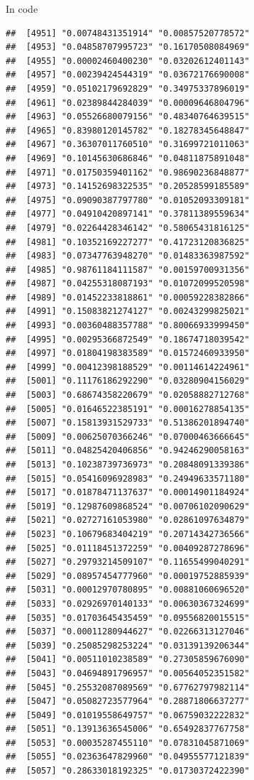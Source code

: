 \documentclass[ignorenonframetext,]{beamer}
\begin{document}
\begin{frame}[fragile]{In code}
\begin{verbatim}
##  [4951] "0.00748431351914" "0.00857520778572"
##  [4953] "0.04858707995723" "0.16170508084969"
##  [4955] "0.00002460400230" "0.03202612401143"
##  [4957] "0.00239424544319" "0.03672176690008"
##  [4959] "0.05102179692829" "0.34975337896019"
##  [4961] "0.02389844284039" "0.00009646804796"
##  [4963] "0.05526680079156" "0.48340764639515"
##  [4965] "0.83980120145782" "0.18278345648847"
##  [4967] "0.36307011760510" "0.31699721011063"
##  [4969] "0.10145630686846" "0.04811875891048"
##  [4971] "0.01750359401162" "0.98690236848877"
##  [4973] "0.14152698322535" "0.20528599185589"
##  [4975] "0.09090387797780" "0.01052093309181"
##  [4977] "0.04910420897141" "0.37811389559634"
##  [4979] "0.02264428346142" "0.58065431816125"
##  [4981] "0.10352169227277" "0.41723120836825"
##  [4983] "0.07347763948270" "0.01483363987592"
##  [4985] "0.98761184111587" "0.00159700931356"
##  [4987] "0.04255318087193" "0.01072099520598"
##  [4989] "0.01452233818861" "0.00059228382866"
##  [4991] "0.15083821274127" "0.00243299825021"
##  [4993] "0.00360488357788" "0.80066933999450"
##  [4995] "0.00295366872549" "0.18674718039542"
##  [4997] "0.01804198383589" "0.01572460933950"
##  [4999] "0.00412398188529" "0.00114614224961"
##  [5001] "0.11176186292290" "0.03280904156029"
##  [5003] "0.68674358220679" "0.02058882712768"
##  [5005] "0.01646522385191" "0.00016278854135"
##  [5007] "0.15813931529733" "0.51386201894740"
##  [5009] "0.00625070366246" "0.07000463666645"
##  [5011] "0.04825420406856" "0.94246290058163"
##  [5013] "0.10238739736973" "0.20848091339386"
##  [5015] "0.05416096928983" "0.24949633571180"
##  [5017] "0.01878471137637" "0.00014901184924"
##  [5019] "0.12987609868524" "0.00706102090629"
##  [5021] "0.02727161053980" "0.02861097634879"
##  [5023] "0.10679683404219" "0.20714342736566"
##  [5025] "0.01118451372259" "0.00409287278696"
##  [5027] "0.29793214509107" "0.11655499040291"
##  [5029] "0.08957454777960" "0.00019752885939"
##  [5031] "0.00012970780895" "0.00881060696520"
##  [5033] "0.02926970140133" "0.00630367324699"
##  [5035] "0.01703645435459" "0.09556820015515"
##  [5037] "0.00011280944627" "0.02266313127046"
##  [5039] "0.25085298253224" "0.03139139206344"
##  [5041] "0.00511010238589" "0.27305859676090"
##  [5043] "0.04694891796957" "0.00564052351582"
##  [5045] "0.25532087089569" "0.67762797982114"
##  [5047] "0.05082723577964" "0.28871806637277"
##  [5049] "0.01019558649757" "0.06759032222832"
##  [5051] "0.13913636545006" "0.65492837767758"
##  [5053] "0.00035287455110" "0.07831045871069"
##  [5055] "0.02363647829960" "0.04955577121839"
##  [5057] "0.28633018192325" "0.01730372422390"

\end{verbatim}
\end{frame}
\end{document}
